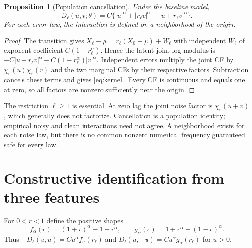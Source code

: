 \documentclass[11pt,a4paper]{article}
\newtheorem{proposition}[theorem]{Proposition}
\theoremstyle{remark}\newtheorem{remark}[theorem]{Remark}
\begin{document}
\begin{proposition}[Population cancellation]\label{prop:cancel}
Under the baseline model,
\begin{equation}\label{eq:kernel}
D_\ell(u,v;\theta)=C\{|u|^\alpha+|r_\ell v|^\alpha-|u+r_\ell v|^\alpha\}.
\end{equation}
For each error law, the interaction is defined on a neighborhood of the origin.
\end{proposition}
\begin{proof}
The transition gives $X_\ell-\mu=r_\ell(X_0-\mu)+W_\ell$ with independent $W_\ell$ of exponent coefficient $C(1-r_\ell^\alpha)$. Hence the latent joint log modulus is
$-C|u+r_\ell v|^\alpha-C(1-r_\ell^\alpha)|v|^\alpha$.
Independent errors multiply the joint CF by $\chi_\varepsilon(u)\chi_\varepsilon(v)$ and the two marginal CFs by their respective factors. Subtraction cancels these terms and gives \eqref{eq:kernel}. Every CF is continuous and equals one at zero, so all factors are nonzero sufficiently near the origin.
\end{proof}

The restriction $\ell\ge1$ is essential. At zero lag the joint noise factor is $\chi_\varepsilon(u+v)$, which generally does not factorize. Cancellation is a population identity; empirical noisy and clean interactions need not agree. A neighborhood exists for each noise law, but there is no common nonzero numerical frequency guaranteed safe for every law.

\section{Constructive identification from three features}\label{sec:id}
For $0<r<1$ define the positive shapes
\begin{equation}\label{eq:shapes}
f_\alpha(r)=(1+r)^\alpha-1-r^\alpha,\qquad
g_\alpha(r)=1+r^\alpha-(1-r)^\alpha.
\end{equation}
Thus $-D_\ell(u,u)=Cu^\alpha f_\alpha(r_\ell)$ and
$D_\ell(u,-u)=Cu^\alpha g_\alpha(r_\ell)$ for $u>0$.
\end{document}
